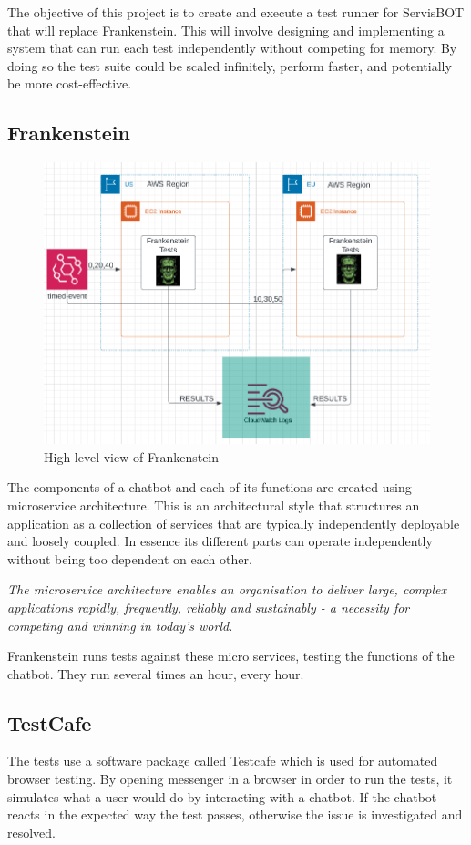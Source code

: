 \documentclass[12pt,a4paper,titlepage]{report}
\begin{document}
The objective of this project is to create and execute a test runner for
ServisBOT that will replace Frankenstein. This will involve designing and implementing a system
that can run each test independently without competing for memory. By doing so the
test suite could be scaled infinitely, perform faster, and potentially be more cost-effective.

\subsection{Frankenstein}
\begin{figure}[ht]
  \centering
  \includegraphics[width=\textwidth,height=\textheight,keepaspectratio]{./diagrams/frank_high_level.png}
  \caption{High level view of Frankenstein}
 \end{figure}
The components of a chatbot and each of its functions are created using microservice architecture. 
This is an architectural style that structures an application as a collection of services that are typically independently deployable and loosely coupled.
In essence its different parts can operate independently without being too dependent on each other.

\textit{The microservice architecture enables an organisation to deliver large, complex applications rapidly, frequently, reliably and sustainably - a necessity for competing and winning in today's world.}\autocite{Microservices}

Frankenstein runs tests against these micro services, testing the functions of the chatbot. They run several times an hour, every hour. 
\clearpage
\subsection{TestCafe}
The tests use a software package called Testcafe which is used for automated browser testing.  
By opening messenger in a browser in order to run the tests, it simulates what a user would do by interacting with a chatbot. 
If the chatbot reacts in the expected way the test passes, otherwise the issue is investigated and resolved.
\end{document}
